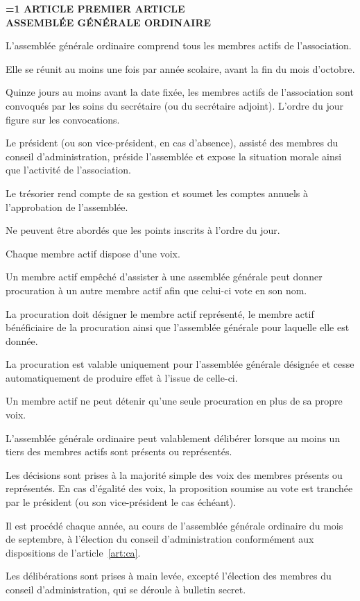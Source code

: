 \documentclass[a4paper,12pt]{article}
\newcounter{statutarticle}
\newcommand{\statutarticle}[2]{%
    \refstepcounter{statutarticle}%
    \label{#2}%
    \vspace{1.2em}%
    \begin{center}
        \textbf{%
            \ifnum\value{statutarticle}=1
                ARTICLE PREMIER%
            \else
                ARTICLE \arabic{statutarticle}%
            \fi
        }\\[0.3em]
        \textbf{#1}
    \end{center}
    \vspace{0.4em}%
}
\begin{document}
\statutarticle{ASSEMBLÉE GÉNÉRALE ORDINAIRE}{art:ago}

L'assemblée générale ordinaire comprend tous les membres actifs de l'association.

Elle se réunit au moins une fois par année scolaire, avant la fin du mois d'octobre.

Quinze jours au moins avant la date fixée, les membres actifs de l'association sont convoqués par les soins du secrétaire (ou du secrétaire adjoint). L'ordre du jour figure sur les convocations.

Le président (ou son vice-président, en cas d'absence), assisté des membres du conseil d'administration, préside l'assemblée et expose la situation morale ainsi que l'activité de l'association.

Le trésorier rend compte de sa gestion et soumet les comptes annuels à l'approbation de l'assemblée.


Ne peuvent être abordés que les points inscrits à l'ordre du jour.

Chaque membre actif dispose d'une voix.

Un membre actif empêché d'assister à une assemblée générale peut donner procuration à un autre membre actif afin que celui-ci vote en son nom.

La procuration doit désigner le membre actif représenté, le membre actif bénéficiaire de la procuration ainsi que l'assemblée générale pour laquelle elle est donnée.

La procuration est valable uniquement pour l'assemblée générale désignée et cesse automatiquement de produire effet à l'issue de celle-ci.

Un membre actif ne peut détenir qu'une seule procuration en plus de sa propre voix.

L'assemblée générale ordinaire peut valablement délibérer lorsque au moins un tiers des membres actifs sont présents ou représentés.

Les décisions sont prises à la majorité simple des voix des membres présents ou représentés. En cas d'égalité des voix, la proposition soumise au vote est tranchée par le président (ou son vice-président le cas échéant).

Il est procédé chaque année, au cours de l'assemblée générale ordinaire du mois de septembre, à l'élection du conseil d'administration conformément aux dispositions de l'article~\ref{art:ca}.

Les délibérations sont prises à main levée, excepté l'élection des membres du conseil d'administration, qui se déroule à bulletin secret.
\end{document}
